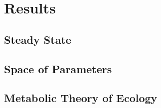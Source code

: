 \section*{Results}

\vspace{0.25cm}
\subsection*{Steady State}

\vspace{0.25cm}
\subsection*{Space of Parameters}

\vspace{0.25cm}
\subsection*{Metabolic Theory of Ecology}



